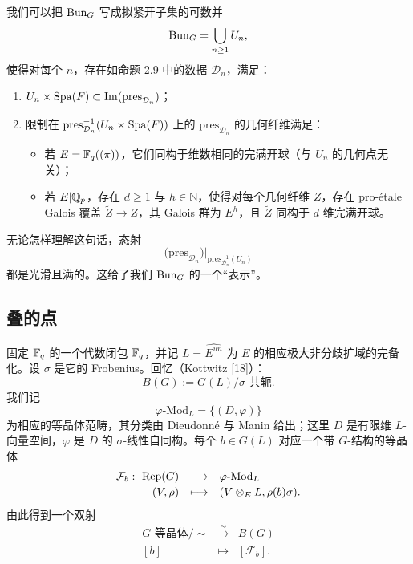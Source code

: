 \begin{proposition}\label{prop:2.10}
我们可以把 $\mathrm{Bun}_G$ 写成拟紧开子集的可数并
\[
\mathrm{Bun}_G=\bigcup_{n\ge1}U_n,
\]
使得对每个 $n$，存在如命题 2.9 中的数据 $\mathcal{D}_n$，满足：
\begin{enumerate}[label=(\arabic*),leftmargin=*]
\item $U_n\times\mathrm{Spa}(F)\subset \mathrm{Im}(\mathrm{pres}_{\mathcal{D}_n})$；
\item 限制在 $\mathrm{pres}_{\mathcal{D}_n}^{-1}(U_n\times\mathrm{Spa}(F))$ 上的 $\mathrm{pres}_{\mathcal{D}_n}$ 的几何纤维满足：
\begin{itemize}
\item 若 $E=\mathbb{F}_q((\pi))$，它们同构于维数相同的完满开球（与 $U_n$ 的几何点无关）；
\item 若 $E|\mathbb{Q}_p$，存在 $d\ge1$ 与 $h\in\mathbb{N}$，使得对每个几何纤维 $Z$，存在 pro-étale Galois 覆盖 $\widetilde{Z}\to Z$，其 Galois 群为 $E^h$，且 $\widetilde{Z}$ 同构于 $d$ 维完满开球。
\end{itemize}
\end{enumerate}
\end{proposition}


无论怎样理解这句话，态射
\[
\bigl(\mathrm{pres}_{\mathcal{D}_n}\bigr)\big|_{\mathrm{pres}^{-1}_{\mathcal{D}_n}(U_n)}
\]
都是光滑且满的。这给了我们 $\mathrm{Bun}_G$ 的一个“表示”。

\subsection{叠的点}%

固定 $\mathbb{F}_q$ 的一个代数闭包 $\overline{\mathbb{F}}_q$，并记 $L=\widehat{E^{un}}$ 为 $E$ 的相应极大非分歧扩域的完备化。设 $\sigma$ 是它的 Frobenius。回忆（Kottwitz [18]）：
\[
B(G):=G(L)/\sigma\text{-共轭}.
\]
我们记
\[
\varphi\text{-}\mathrm{Mod}_L=\{(D,\varphi)\}
\]
为相应的等晶体范畴，其分类由 Dieudonné 与 Manin 给出；这里 $D$ 是有限维 $L$-向量空间，$\varphi$ 是 $D$ 的 $\sigma$-线性自同构。每个 $b\in G(L)$ 对应一个带 $G$-结构的等晶体
\[
\begin{array}{rcl}
\mathcal{F}_b:\ \mathrm{Rep}(G) & \longrightarrow & \varphi\text{-}\mathrm{Mod}_L\\[2pt]
(V,\rho) & \longmapsto & (V\otimes_E L,\rho(b)\sigma).
\end{array}
\]
由此得到一个双射
\[
\begin{array}{rcl}
\text{$G$-等晶体}/\sim & \xrightarrow{\ \sim\ } & B(G)\\[2pt]
[b] & \longmapsto & [\mathcal{F}_b].
\end{array}
\]


